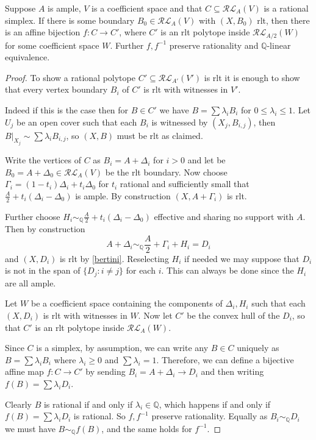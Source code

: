 \documentclass[a4paper,12pt]{amsart}
\begin{document}
	\begin{lemma}\label{rlt-repl}
		Suppose $A$ is ample, $V$ is a coefficient space and that $C\subseteq \mathcal{RL}_{A}(V)$ is a rational simplex. If there is some boundary $B_{0} \in \mathcal{RL}_{A}(V)$ with $(X,B_{0})$ rlt, then there is an affine bijection $f:C \to C'$, where $C'$ is an rlt polytope inside $\mathcal{RL}_{A/2}(W)$ for some coefficient space $W$. Further $f, f^{-1}$ preserve rationality and $\mathbb{Q}$-linear equivalence.
	\end{lemma}

	\begin{proof}
		To show a rational polytope $C'\subseteq \mathcal{RL}_{A'}(V')$ is rlt it is enough to show that every vertex boundary $B_{i}$ of $C'$ is rlt with witnesses in $V'$.
				
		Indeed if this is the case then for $B \in C'$ we have $B= \sum \lambda_{i} B_{i}$ for $0 \leq \lambda_{i} \leq 1$. Let $U_{j}$ be an open cover such that each $B_{i}$ is witnessed by $(X_{j},B_{i,j})$, then $B|_{X_{j}}\sim \sum \lambda_{i}B_{i,j}$, so $(X,B)$ must be rlt as claimed.
		
		
		
		Write the vertices of $C$ as $B_{i}=A+\Delta_{i}$ for $i > 0$ and let be $B_{0}=A+\Delta_{0} \in \mathcal{RL}_{A}(V)$ be the rlt boundary. Now choose $\Gamma_{i} =(1-t_{i})\Delta_{i}+t_{i}\Delta_{0}$ for $t_{i}$ rational and sufficiently small that $\frac{A}{2}+t_{i}(\Delta_{i}-\Delta_{0})$ is ample. By construction $(X,A+\Gamma_{i})$ is rlt.
		
		Further choose $H_{i} \sim_{\mathbb{Q}} \frac{A}{2}+t_{i}(\Delta_{i}-\Delta_{0})$ effective and sharing no support with $A$. Then by construction
		\[A+\Delta_{i} \sim_{\mathbb{Q}} \frac{A}{2}+\Gamma_{i}+H_{i}=D_{i}\]
		and $(X,D_{i})$ is rlt by \autoref{bertini}. Reselecting $H_{i}$ if needed we may suppose that $D_{i}$ is not in the span of $\{D_{j}: i \neq j\}$ for each $i$. This can always be done since the $H_{i}$ are all ample.
		
		Let $W$ be a coefficient space containing the components of $\Delta_{i}, H_{i}$ such that each $(X,D_{i})$ is rlt with witnesses in $W$. Now let $C'$ be the convex hull of the $D_{i}$, so that $C'$ is an rlt polytope inside $\mathcal{RL}_{A}(W)$.
		
		Since $C$ is a simplex, by assumption, we can write any $B \in C$ uniquely as $B=\sum \lambda_{i} B_{i}$ where $\lambda_{i} \geq 0$ and $\sum \lambda_{i} =1$. Therefore, we can define a bijective affine map $f: C \to C'$ by sending $B_{i}=A+\Delta_{i} \to D_{i}$ and then writing $f(B)= \sum \lambda_{i} D_{i}$.
		
		Clearly $B$ is rational if and only if $\lambda_{i} \in \mathbb{Q}$, which happens if and only if $f(B)=\sum \lambda_{i} D_{i}$ is rational. So $f, f^{-1}$ preserve rationality. Equally as $B_{i} \sim_{\mathbb{Q}} D_{i}$ we must have $B \sim_{\mathbb{Q}} f(B)$, and the same holds for $f^{-1}$.
			
	\end{proof}
\end{document}
